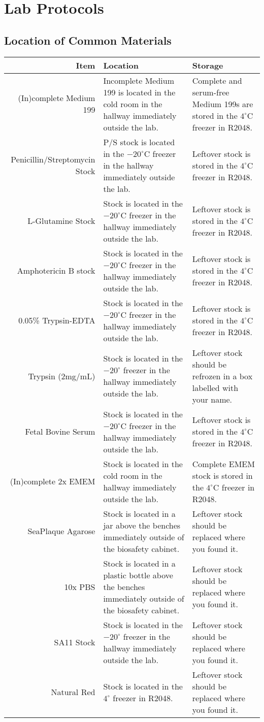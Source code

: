 
\section{Lab Protocols}

\subsection{Location of Common Materials}

\begin{tabular*}{\textwidth}{r | p{2in} p{2in}}
\hline
Item & Location & Storage \\
\hline
(In)complete Medium 199 & Incomplete Medium 199 is located in the cold room in the hallway immediately outside the lab. & Complete and serum-free Medium 199s are stored in the $4^{\circ}$C freezer in R2048.\\
Penicillin/Streptomycin Stock & P/S stock is located in the $-20^{\circ}$C freezer in the hallway immediately outside the lab. & Leftover stock is stored in the $4^{\circ}$C freezer in R2048.\\
L-Glutamine Stock & Stock is located in the $-20^{\circ}$C freezer in the hallway immediately outside the lab. & Leftover stock is stored in the $4^{\circ}$C freezer in R2048.\\
Amphotericin B stock & Stock is located in the $-20^{\circ}$C freezer in the hallway immediately outside the lab. & Leftover stock is stored in the $4^{\circ}$C freezer in R2048.\\
0.05\% Trypsin-EDTA & Stock is located in the $-20^{\circ}$C freezer in the hallway immediately outside the lab. & Leftover stock is stored in the $4^{\circ}$C freezer in R2048.\\
Trypsin ($2$mg/mL) & Stock is located in the $-20^{\circ}$ freezer in the hallway immediately outside the lab. & Leftover stock should be refrozen in a box labelled with your name.\\
Fetal Bovine Serum & Stock is located in the $-20^{\circ}$C freezer in the hallway immediately outside the lab. & Leftover stock is stored in the $4^{\circ}$C freezer in R2048.\\
(In)complete 2x EMEM & Stock is located in the cold room in the hallway immediately outside the lab. & Complete EMEM stock is stored in the $4^{\circ}$C freezer in R2048.\\
SeaPlaque Agarose & Stock is located in a jar above the benches immediately outside of the biosafety cabinet. & Leftover stock should be replaced where you found it.\\
10x PBS & Stock is located in a plastic bottle above the benches immediately outside of the biosafety cabinet. & Leftover stock should be replaced where you found it. \\
SA11 Stock & Stock is located in the $-20^{\circ}$ freezer in the hallway immediately outside the lab. & Leftover stock should be replaced where you found it.\\
Natural Red & Stock is located in the $4^{\circ}$ freezer in R2048. & Leftover stock should be replaced where you found it.\\
\hline
\end{tabular*}


